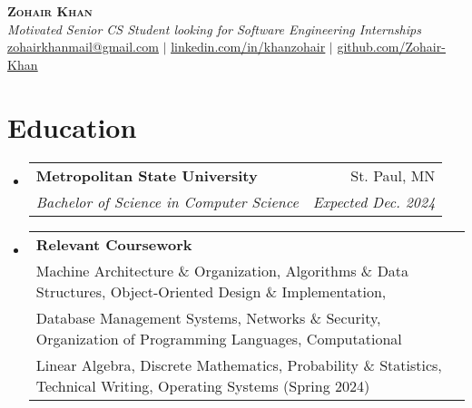 \documentclass[letterpaper,11pt]{article}
\makeatletter
\newcommand{\resumeSubheading}[4]{
  \vspace{-1pt}\item
    \begin{tabular*}{0.97\textwidth}{l@{\extracolsep{\fill}}r}
      \textbf{#1} & #2 \\
      \textit{\small#3} & \textit{\small #4} \\
    \end{tabular*}\vspace{-5pt}
}
\newcommand{\resumeCoursework}[4]{
  \vspace{-1pt}\item
    \begin{tabular*}{0.97\textwidth}{l@{\extracolsep{\fill}}r}
      \textbf{#1}\\
      {\small#2} \\
      {\small #3} \\
      {\small #4} \\
    \end{tabular*}\vspace{-5pt}
}
\newcommand{\resumeSubHeadingListStart}{\begin{itemize}[leftmargin=*]}
\newcommand{\resumeSubHeadingListEnd}{\end{itemize}}
\makeatother
\begin{document}
  

\begin{center}
    \textbf{\Huge \scshape Zohair Khan} \\ \vspace{1pt}
    \textit{Motivated Senior CS Student looking for Software Engineering Internships} \\
    \small \href{mailto:zohairkhanmail@gmail.com}{\underline{zohairkhanmail@gmail.com}} $|$ 
    \href{https://www.linkedin.com/in/khanzohair/}{\underline{linkedin.com/in/khanzohair}} $|$
    \href{https://github.com/Zohair-Khan}{\underline{github.com/Zohair-Khan}} 
\end{center} \vspace{-15pt}


\section{Education}
  \resumeSubHeadingListStart
    \resumeSubheading
      {Metropolitan State University}{St. Paul, MN}
      {Bachelor of Science in Computer Science}{Expected Dec. 2024}
    \resumeCoursework
      {Relevant Coursework}
      {Machine Architecture \& Organization, Algorithms \& Data Structures, Object-Oriented Design \& Implementation,}
      {Database Management Systems, Networks \& Security, Organization of Programming Languages, Computational }
      {Linear Algebra, Discrete Mathematics, Probability \& Statistics, Technical Writing, Operating Systems (Spring 2024)}
  \resumeSubHeadingListEnd 

\end{document}
